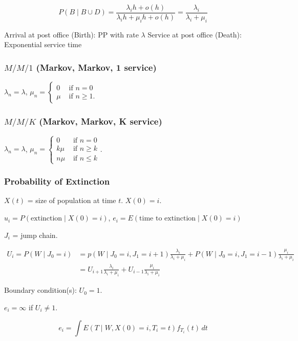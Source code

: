 \documentclass{article}
\theoremstyle{definition}
\begin{document}
$$
P(B \mid B \cup D) = \frac{\lambda_i h + o(h)}{\lambda_i h + \mu_i h + o(h)} =  \frac{\lambda_i}{\lambda_i + \mu_i}
$$

Arrival at post office (Birth):
PP with rate $\lambda$ 
Service at post office (Death):
Exponential service time 

\subsubsection*{$M/M/1$ (Markov, Markov, 1 service)}

$\lambda_n = \lambda$, $\mu_n = \begin{cases}
0 & \text{ if } n = 0 \\
\mu & \text{ if } n \ge 1. \end{cases}$

\subsubsection*{$M/M/K$ (Markov, Markov, K service)}

$\lambda_n = \lambda$, $\mu_n = \begin{cases}
0 & \text{ if } n = 0 \\
k \mu & \text{ if } n \ge k \\
n \mu & \text{ if } n \le k
\end{cases}$.

\subsubsection{Probability of Extinction}
$X(t)$ = size of population at time $t$.
$X(0) = i$.

$u_i = P(\text{extinction} \mid X(0) = i)$, 
$e_i = E(\text{time to extinction} \mid X(0) = i)$

$J_i$ = jump chain.

\begin{align*}
U_i = P(W \mid J_0 = i) 
&= p(W \mid J_0 = i, J_1 = i + 1) \frac{\lambda_i}{\lambda_i + \mu_i} + P(W \mid J_0 = i, J_1 = i - 1) \frac{\mu_i}{\lambda_i + \mu_i} \\
&= U_{i+1} \frac{\lambda_i}{\lambda_i + \mu_i} + U_{i-1} \frac{\mu_i}{\lambda_i + \mu_i}
\end{align*}

Boundary condition(s): $U_0 = 1$.

$e_i = \infty$ if $U_i \ne 1$.

$$
e_i = \int E( T \mid W, X(0) = i, T_i = t) f_{T_i}(t) \, dt
$$
\end{document}
